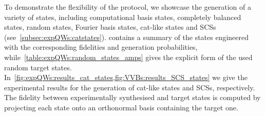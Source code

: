 To demonstrate the flexibility of the protocol, we showcase the generation of a variety of states, including
computational basis states, completely balanced states, random states, Fourier basis states, cat-like states and \acp{SCS} (see~\cref{subsec:expQWs:catstates}).
 contains a summary of the states engineered with the corresponding fidelities and generation probabilities,
while~\cref{table:expQWs:random_states_amps} gives the explicit form of the used random target states.
In~\cref{fig:expQWs:results_cat_states,fig:VVBs:results_SCS_states} we give the experimental results for the generation of cat-like states and \acp{SCS}, respectively.
The fidelity between experimentally synthesised and target states is computed by projecting each state onto an orthonormal basis containing the target one.

